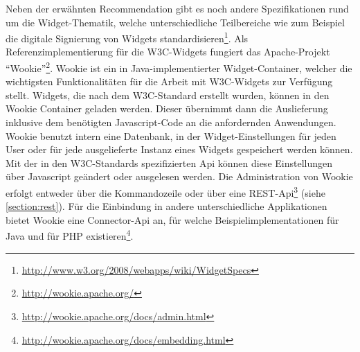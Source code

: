 Neben der erwähnten Recommendation gibt es noch andere Spezifikationen rund um die Widget-Thematik, welche unterschiedliche Teilbereiche wie zum Beispiel die digitale Signierung von Widgets standardisieren\footnote{\url{http://www.w3.org/2008/webapps/wiki/WidgetSpecs}}. Als Referenzimplementierung für die W3C-Widgets fungiert das Apache-Projekt "`Wookie"'\footnote{\url{http://wookie.apache.org/}}. Wookie ist ein in Java-implementierter Widget-Container, welcher die wichtigsten Funktionalitäten für die Arbeit mit W3C-Widgets zur Verfügung stellt. Widgets, die nach dem W3C-Standard erstellt wurden, können in den Wookie Container geladen werden. Dieser übernimmt dann die Auslieferung inklusive dem benötigten Javascript-Code an die anfordernden Anwendungen. Wookie benutzt intern eine Datenbank, in der Widget-Einstellungen für jeden User oder für jede ausgelieferte Instanz eines Widgets gespeichert werden können. Mit der in den W3C-Standards spezifizierten Api können diese Einstellungen über Javascript geändert oder ausgelesen werden. Die Administration von Wookie erfolgt entweder über die Kommandozeile oder über eine REST-Api\footnote{\url{http://wookie.apache.org/docs/admin.html}} (siehe \ref{section:rest}). Für die Einbindung in andere unterschiedliche Applikationen bietet Wookie eine Connector-Api an, für welche Beispielimplementationen für Java und für PHP existieren\footnote{\url{http://wookie.apache.org/docs/embedding.html}}.

